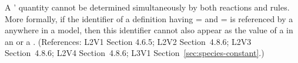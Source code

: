 A \Species' quantity cannot be determined simultaneously by both
reactions and rules.  More formally, if the identifier of a
\Species definition having =
and = is referenced by a
\SpeciesReference anywhere in a model, then this identifier cannot
also appear as the value of a  in an
\AssignmentRule or a \RateRule.  (References: L2V1 Section 4.6.5;
L2V2 Section~4.8.6; L2V3 Section~4.8.6; L2V4 Section~4.8.6; 
L3V1 Section~\ref{sec:species-constant}.)
